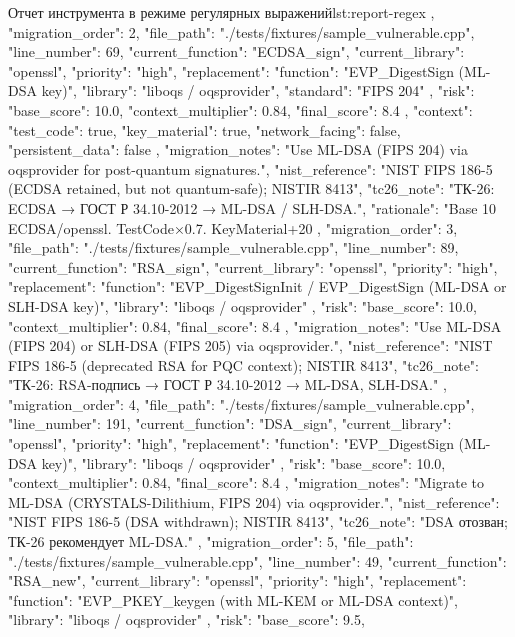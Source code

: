 \documentclass{itmo-vkr}
\begin{document}
\begin{itmolisting}[JSON]{Отчет инструмента в режиме регулярных выражений}{lst:report-regex}
{{		},
		{
			"migration_order": 2,
			"file_path": "./tests/fixtures/sample_vulnerable.cpp",
			"line_number": 69,
			"current_function": "ECDSA_sign",
			"current_library": "openssl",
			"priority": "high",
			"replacement": {
				"function": "EVP_DigestSign (ML-DSA key)",
				"library": "liboqs / oqsprovider",
				"standard": "FIPS 204"
			},
			"risk": {
				"base_score": 10.0,
				"context_multiplier": 0.84,
				"final_score": 8.4
			},
			"context": {
				"test_code": true,
				"key_material": true,
				"network_facing": false,
				"persistent_data": false
			},
			"migration_notes": "Use ML-DSA (FIPS 204) via oqsprovider for post-quantum signatures.",
			"nist_reference": "NIST FIPS 186-5 (ECDSA retained, but not quantum-safe); NISTIR 8413",
			"tc26_note": "ТК-26: ECDSA → ГОСТ Р 34.10-2012 → ML-DSA / SLH-DSA.",
			"rationale": "Base 10 ECDSA/openssl. TestCode×0.7. KeyMaterial+20%
		},
		{
			"migration_order": 3,
			"file_path": "./tests/fixtures/sample_vulnerable.cpp",
			"line_number": 89,
			"current_function": "RSA_sign",
			"current_library": "openssl",
			"priority": "high",
			"replacement": {
				"function": "EVP_DigestSignInit / EVP_DigestSign (ML-DSA or SLH-DSA key)",
				"library": "liboqs / oqsprovider"
			},
			"risk": {
				"base_score": 10.0,
				"context_multiplier": 0.84,
				"final_score": 8.4
			},
			"migration_notes": "Use ML-DSA (FIPS 204) or SLH-DSA (FIPS 205) via oqsprovider.",
			"nist_reference": "NIST FIPS 186-5 (deprecated RSA for PQC context); NISTIR 8413",
			"tc26_note": "ТК-26: RSA-подпись → ГОСТ Р 34.10-2012 → ML-DSA, SLH-DSA."
		},
		{
			"migration_order": 4,
			"file_path": "./tests/fixtures/sample_vulnerable.cpp",
			"line_number": 191,
			"current_function": "DSA_sign",
			"current_library": "openssl",
			"priority": "high",
			"replacement": {
				"function": "EVP_DigestSign (ML-DSA key)",
				"library": "liboqs / oqsprovider"
			},
			"risk": {
				"base_score": 10.0,
				"context_multiplier": 0.84,
				"final_score": 8.4
			},
			"migration_notes": "Migrate to ML-DSA (CRYSTALS-Dilithium, FIPS 204) via oqsprovider.",
			"nist_reference": "NIST FIPS 186-5 (DSA withdrawn); NISTIR 8413",
			"tc26_note": "DSA отозван; ТК-26 рекомендует ML-DSA."
		},
		{
			"migration_order": 5,
			"file_path": "./tests/fixtures/sample_vulnerable.cpp",
			"line_number": 49,
			"current_function": "RSA_new",
			"current_library": "openssl",
			"priority": "high",
			"replacement": {
				"function": "EVP_PKEY_keygen (with ML-KEM or ML-DSA context)",
				"library": "liboqs / oqsprovider"
			},
			"risk": {
				"base_score": 9.5,
}}}
\end{itmolisting}
\end{document}
